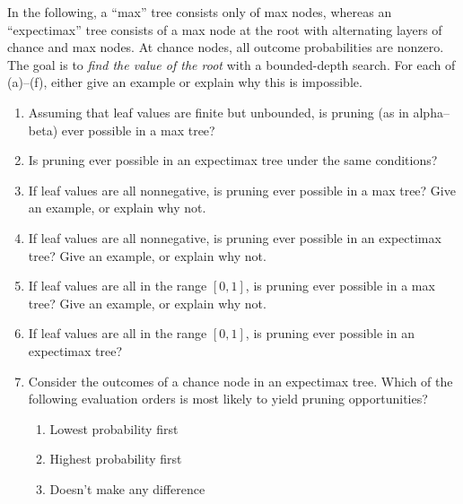 \begin{uexercise}
In the following, a ``max'' tree consists only of max nodes, whereas an ``expectimax'' tree consists
of a max node at the root with alternating layers of chance and max nodes. At chance nodes, all outcome
probabilities are nonzero. The goal is to
{\em find the value of the root} with a bounded-depth search. For each of (a)--(f),
either give an example or explain why this is impossible.
\begin{enumerate}
\item Assuming that leaf values
are finite but unbounded, is pruning (as in alpha--beta) ever possible 
in a max tree?

\item Is pruning ever possible 
in an expectimax tree under the same conditions?

\item If leaf values are all nonnegative, is pruning ever possible 
in a max tree? Give an example, or explain why not.

\item If leaf values are all nonnegative, is pruning ever possible 
in an expectimax tree? Give an example, or explain why not.

\item If leaf values are all in the range \([0,1]\), is pruning ever possible 
in a max tree? Give an example, or explain why not.

\item If leaf values are all in the range \([0,1]\), is pruning ever possible 
in an expectimax tree? 

\item Consider the outcomes of a chance node in an expectimax tree.
Which of the following evaluation orders is most likely to yield pruning opportunities?
\begin{enumerate}
\item Lowest probability first
\item Highest probability first
\item Doesn't make any difference
\end{enumerate}
\end{enumerate}
\end{uexercise} 

